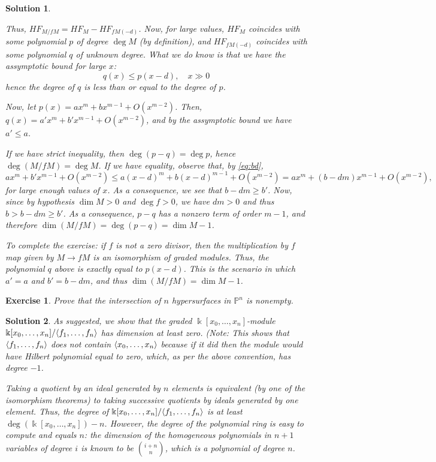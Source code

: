\documentclass{article}
\newtheorem{ex}{Exercise}
\theoremstyle{nonumberplain}
\newtheorem{sol}{Solution}
\newcommand{\kk}{\Bbbk}
\newcommand{\PP}{\mathbb{P}}
\DeclarePairedDelimiter{\braket}{\langle}{\rangle}
\begin{document}
\begin{sol}
\begin{enumerate}
Thus, $HF_{M/fM} = HF_M - HF_{f M(-d)}$. Now, for large values, $HF_M$ coincides with some polynomial $p$ of degree $\deg M$ (by definition), and $HF_{f M(-d)}$ coincides with some polynomial $q$ of unknown degree. What we do know is that we have the assymptotic bound for large $x$:
\begin{equation}\label{eq:bd}
q(x) \leq p(x-d), \quad x \gg 0
\end{equation}
hence the degree of $q$ is less than or equal to the degree of $p$.

Now, let $p(x) = a x^m + b x^{m-1} + O(x^{m-2})$. Then, $q(x) = a' x^m + b' x^{m-1} + O(x^{m-2})$, and by the assymptotic bound we have $a' \leq a$.

If we have strict inequality, then $\deg (p-q) = \deg p$, hence $\deg(M/fM) = \deg M$. If we have equality, observe that, by \eqref{eq:bd},
\begin{equation}
a x^m + b' x^{m-1} + O(x^{m-2}) \leq a (x-d)^m + b (x-d)^{m-1} + O(x^{m-2}) = a x^m + (b - d m) x^{m-1} + O(x^{m-2}),
\end{equation}
for large enough values of $x$. As a consequence, we see that $b - d m \geq b'$. Now, since by hypothesis $\dim M > 0$ and $\deg f > 0$, we have $dm > 0$ and thus $b > b-dm \geq b'$. As a consequence, $p-q$ has a nonzero term of order $m-1$, and therefore $\dim(M/fM) = \deg(p-q) = \dim M - 1$.

\smallskip

To complete the exercise: if $f$ is not a zero divisor, then the multiplication by $f$ map given by $M \to f M$ is an isomorphism of graded modules. Thus, the polynomial $q$ above is exactly equal to $p(x-d)$. This is the scenario in which $a' = a$ and $b' = b - dm$, and thus $\dim(M/fM) = \dim M - 1$.
\end{enumerate}
\end{sol}

\begin{ex}
Prove that the intersection of $n$ hypersurfaces in $\PP^n$ is nonempty.
\end{ex}

\begin{sol}
As suggested, we show that the graded $\kk[x_0, \dots, x_n]$-module $\kk[x_0, \dots, x_n]/\braket{f_1, \dots, f_n}$ has dimension at least zero. (Note: This shows that $\braket{f_1, \dots, f_n}$ does not contain $\braket{x_0,\dots,x_n}$ because if it did then the module would have Hilbert polynomial equal to zero, which, as per the above convention, has degree $-1$.

Taking a quotient by an ideal generated by $n$ elements is equivalent (by one of the isomorphism theorems) to taking successive quotients by ideals generated by one element. Thus, the degree of $\kk[x_0, \dots, x_n]/\braket{f_1, \dots, f_n}$ is at least $\deg(\kk[x_0, \dots, x_n]) - n$. However, the degree of the polynomial ring is easy to compute and equals $n$: the dimension of the homogeneous polynomials in $n+1$ variables of degree $i$ is known to be $\binom{i+n}{n}$, which is a polynomial of degree $n$.
\end{sol}
\end{document}

